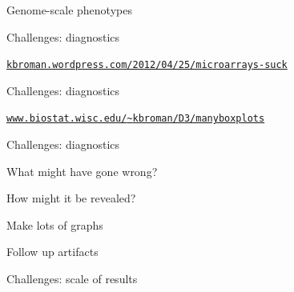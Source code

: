 \documentclass[12pt,t]{beamer}
\begin{document}
\begin{frame}[c]{Genome-scale phenotypes}


\end{frame}




\begin{frame}{Challenges: {\color{foreground} diagnostics}}

\vspace{2mm}


\vspace{3mm}

\hfill \href{https://kbroman.wordpress.com/2012/04/25/microarrays-suck}{\scriptsize \lolit \tt kbroman.wordpress.com/2012/04/25/microarrays-suck}

\end{frame}


\begin{frame}{Challenges: {\color{foreground} diagnostics}}

  \vspace{2mm}


\vspace{3mm}

\hfill
\href{https://www.biostat.wisc.edu/~kbroman/D3/manyboxplots/}{\scriptsize
  \lolit \tt www.biostat.wisc.edu/{\textasciitilde}kbroman/D3/manyboxplots}

\end{frame}



\begin{frame}[c]{Challenges: {\color{foreground} diagnostics}}

\vspace{-20mm}

  \bbi
\item What might have gone wrong?
\item How might it be revealed?
\item Make lots of graphs
\item Follow up artifacts
  \ei

\end{frame}




\begin{frame}[c]{Challenges: {\color{foreground} scale of results}}


\end{frame}
\end{document}
